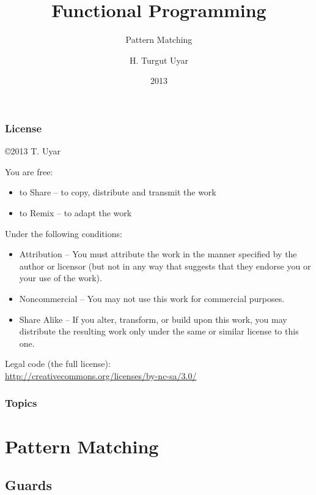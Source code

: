 \documentclass[dvipsnames]{beamer}
\title{Functional Programming}
\subtitle{Pattern Matching}
\author{H. Turgut Uyar}
\date{2013}
\theoremstyle{plain}
\begin{document}
\begin{frame}
  \titlepage
\end{frame}

\begin{frame}
  \frametitle{License}

  \hfill
  \copyright 2013 T. Uyar

  \vfill
  \begin{tiny}
    You are free:
    \begin{itemize}
      \item to Share -- to copy, distribute and transmit the work
      \item to Remix -- to adapt the work
    \end{itemize}

    Under the following conditions:
    \begin{itemize}
      \item Attribution -- You must attribute the work in the manner specified by
        the author or licensor (but not in any way that suggests that they
        endorse you or your use of the work).

      \item Noncommercial -- You may not use this work for commercial purposes.

      \item Share Alike -- If you alter, transform, or build upon this work, you
        may distribute the resulting work only under the same or similar license
        to this one.
    \end{itemize}
  \end{tiny}

  \vfill
  Legal code (the full license):\\
  \url{http://creativecommons.org/licenses/by-nc-sa/3.0/}
\end{frame}

\begin{frame}
  \frametitle{Topics}
  \tableofcontents
\end{frame}

\section{Pattern Matching}

\subsection{Guards}
\end{document}
